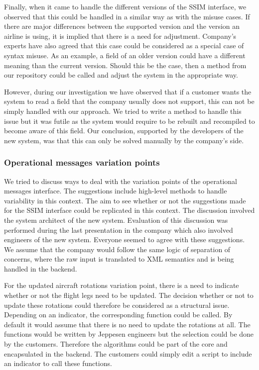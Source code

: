 Finally, when it came to handle the different versions of the SSIM interface, we observed that this could be handled in a similar way as with the misuse cases. If there are major differences between the supported version and the version an airline is using, it is implied that there is a need for adjustment. Company's experts have also agreed that this case could be considered as a special case of syntax misuse.
As an example, a field of an older version could have a different meaning than the current version. Should this be the case, then a method from our repository could be called and adjust the system in the appropriate way. 

However, during our investigation we have observed that if a customer wants the system to read a field that the company usually does not support, this can not be simply handled with our approach. We tried to write a method to handle this issue but it was futile as the system would require to be rebuilt and recompiled to become aware of this field. Our conclusion, supported by the developers of the new system, was that this can only be solved manually by the company's side.


\subsubsection{Operational messages variation points} 

We tried to discuss ways to deal with the variation points of the operational messages interface. The suggestions include high-level methods to handle variability in this context. The aim to see whether or not the suggestions made for the SSIM interface could be replicated in this context. The discussion involved the system architect of the new system. Evaluation of this discussion was performed during the last presentation in the company which also involved engineers of the new system. Everyone seemed to agree with these suggestions. We assume that the company would follow the same logic of separation of concerns, where the raw input is translated to XML semantics and is being handled in the backend. 

For the updated aircraft rotations variation point, there is a need to indicate whether or not the flight legs need to be updated. The decision whether or not to update these rotations could therefore be considered as a structural issue. Depending on an indicator, the corresponding function could be called.  
By default it would assume that there is no need to update the rotations at all. The functions would be written by Jeppesen engineers but the selection could be done by the customers. Therefore the algorithms could be part of the core and encapsulated in the backend. The customers could simply edit a script to include an indicator to call these functions.

